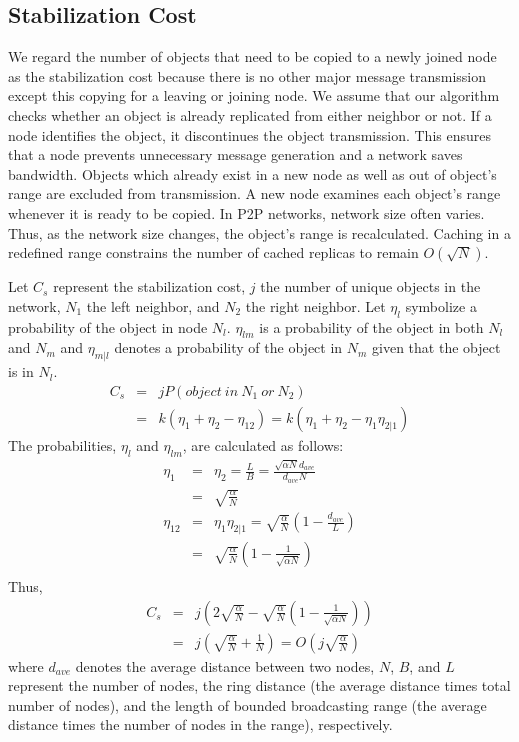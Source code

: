 \documentclass[9.5pt,journal,final,finalsubmission,twocolumn]{IEEEtran}
\begin{document}
\subsection{Stabilization Cost}
\label{sec:stabilization_cost}
We regard the number of objects that need to be copied to 
a newly joined node as the stabilization cost 
because there is no other major message transmission 
except this copying for a leaving or joining node. 
We assume that our algorithm checks whether an object 
is already replicated from either neighbor or not. If a node identifies the 
object, it discontinues the object transmission. This ensures that a node 
prevents unnecessary message generation and a network saves bandwidth.
Objects which already exist in a new node as well as out of 
object's range are excluded from transmission.
A new node examines each object's range whenever it is ready to be copied.
In P2P networks, network size often varies. Thus, as the network
size changes, the object's range is recalculated.
Caching in a redefined range constrains the number of 
cached replicas to remain $O(\sqrt{N})$.
 
Let $C_s$ represent the stabilization cost, $j$ the number of unique objects in the network, 
$N_1$ the left neighbor, 
and $N_2$ the right neighbor. Let $\eta_l$ symbolize a probability of the object in node $N_l$. 
$\eta_{lm}$ is a probability of the object in both $N_l$ and $N_m$ and  
$\eta_{m|l}$ denotes a probability of the object in $N_m$ given that the object is in 
$N_l$. 
\begin{eqnarray*}
C_s &=& j P(object\ in\ N_1\ or\ N_2) \\
    &=& k (\eta_1+\eta_2-\eta_{12}) = k (\eta_1+\eta_2-\eta_1\eta_{2|1})
\end{eqnarray*}
The probabilities, $\eta_l$ and $\eta_{lm}$, are calculated as follows:
\begin{eqnarray*}
\eta_1 &=& \eta_2 = \frac{L}{B} = \frac{\sqrt{\alpha N} d_{ave} }{d_{ave} N} \\
       &=& \sqrt{\frac{\alpha}{N}} \\
\eta_{12} &=& \eta_1 \eta_{2|1} = \sqrt{\frac{\alpha}{N}}\left( 1-\frac{d_{ave}}{L} \right) \\
          &=& \sqrt{\frac{\alpha}{N}}\left(1-\frac{1}{\sqrt{\alpha N}}\right) \\
\end{eqnarray*}
Thus,
\begin{eqnarray}
C_s &=& j\left(2\sqrt{\frac{\alpha}{N}}-\sqrt{\frac{\alpha}{N}}\left(1-\frac{1}{\sqrt{\alpha N}}\right) \right)\nonumber \\
    &=& j(\sqrt{\frac{\alpha}{N}}+\frac{1}{N}) = O\left(j\sqrt{\frac{\alpha}{N}}\right)\label{eq:stab_cost}
\end{eqnarray}
where $d_{ave}$ denotes the average distance between two nodes, 
$N$, $B$, and $L$ represent the number 
of nodes, the ring distance (the average distance times total number of nodes), 
and the length of bounded broadcasting range (the average distance times the number of 
nodes in the range), respectively.
\end{document}
